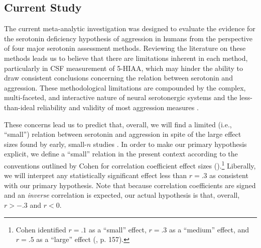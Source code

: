 \subsection{Current Study}
The current meta-analytic investigation was designed to evaluate the evidence for the serotonin deficiency hypothesis of aggression in humans from the perspective of four major serotonin assessment methods. Reviewing the literature on these methods leads us to believe that there are limitations inherent in each method, particularly in CSF measurement of 5-HIAA, which may hinder the ability to draw consistent conclusions concerning the relation between serotonin and aggression. These methodological limitations are compounded by the complex, multi-faceted, and interactive nature of neural serotonergic systems \parencite[][]{Kerman2011, Murphy1996, Tuinier96} and the less-than-ideal reliability and validity of most aggression measures \parencite[see][]{Ferguson2012}. 


These concerns lead us to predict that, overall, we will find a limited (i.e., ``small'') relation between serotonin and aggression in spite of the large effect sizes found by early, small-$n$ studies \parencite[e.g.,][]{Brown79}. In order to make our primary hypothesis explicit, we define a ``small'' relation in the present context according to the conventions outlined by Cohen for correlation coefficient effect sizes (\citeyear{Cohen1992}).\footnote{Cohen identified $r = .1$ as a ``small'' effect, $r = .3$ as a ``medium'' effect, and $r = .5$ as a ``large'' effect (\citeyear{Cohen1992}, p. 157).} Liberally, we will interpret any statistically significant effect less than $r = .3$ as consistent with our primary hypothesis. Note that because correlation coefficients are signed and an \emph{inverse} correlation is expected, our actual hypothesis is that, overall, $r > -.3$ and $r < 0$. 


